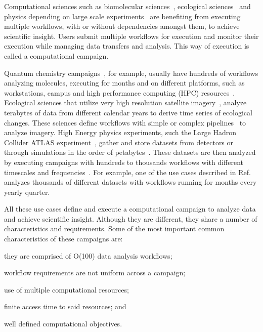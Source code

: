
Computational sciences such as biomolecular
sciences~\cite{cheatham2015impact, dakka2018concurrent}, ecological
sciences~\cite{goncalves2020sealnet, paraskevakos2019workflow} and physics
depending on large scale experiments~\cite{atlas} are benefiting from
executing multiple workflows, with or without dependencies amongst them, to
achieve scientific insight. Users submit multiple workflows for execution and
monitor their execution while managing data transfers and analysis. This way
of execution is called a computational campaign.

Quantum chemistry campaigns~\cite{smith2020molssi}, for example, usually have 
hundreds of workflows analyzing molecules, executing for months and on 
different platforms, such as workstations, campus and high performance 
computing (HPC) resources~\cite{smith2020molssi}. Ecological sciences that 
utilize very high resolution satellite imagery~\cite{goncalves2020sealnet}, 
analyze terabytes of data from different calendar years to derive time series 
of ecological changes. These sciences define workflows with simple or complex 
pipelines~\cite{paraskevakos2019workflow} to analyze imagery. High Energy 
physics experiments, such the Large Hadron Collider ATLAS 
experiment~\cite{atlas}, gather and store datasets from detectors or through 
simulations in the order of petabytes~\cite{borodin2015big}. These datasets are 
then analyzed by executing campaigns with hundreds to thousands workflows with 
different timescales and frequencies~\cite{borodin2015big}. For example, one of 
the use cases described in Ref.~\cite{borodin2015big} analyzes thousands of 
different datasets with workflows running for months every yearly quarter.

All these use cases define and execute a computational campaign to analyze
data and achieve scientific insight. Although they are different, they share a
number of characteristics and requirements. Some of the most important common
characteristics of these campaigns are:
\begin{inparaenum}[(1)]
    \item they are comprised of O(100) data analysis workflows;
    \item workflow requirements are not uniform across a campaign;
    \item use of multiple computational resources;
    \item finite access time to said resources; and
    \item well defined computational objectives.
\end{inparaenum}

